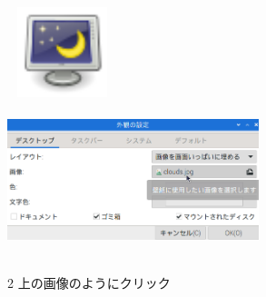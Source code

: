 \documentclass[a4paper,12pt]{jarticle}
\begin{document}
\begin{figure}
\begin{minipage}{\textwidth}
\begin{minipage}{7.737cm}
      \hfill
      \includegraphics[width=3.193cm,height=2.631cm]{textbook-img106.png}\\
      \includegraphics[width=7.324cm,height=4.539cm]{textbook-img108.png}\\
      \begin{minipage}{8.035cm}
        2 上の画像のようにクリック
      \end{minipage}
    \end{minipage}

  \end{minipage}

  \begin{minipage}{\textwidth}


\end{minipage}
\end{figure}
\end{document}
